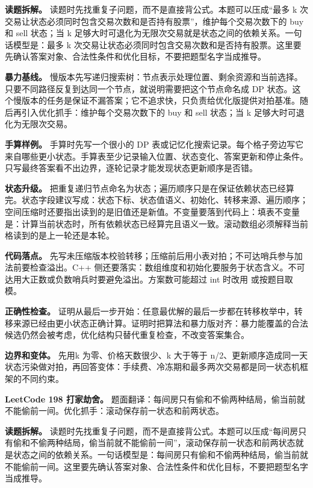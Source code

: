 \textbf{读题拆解。} 读题时先找重复子问题，而不是直接背公式。本题可以压成“最多 k 次交易让状态必须同时包含交易次数和是否持有股票”，维护每个交易次数下的 buy 和 sell 状态；当 k 足够大时可退化为无限次交易就是状态之间的依赖关系。一句话模型是：最多 k 次交易让状态必须同时包含交易次数和是否持有股票。这里要先确认答案对象、合法性条件和优化目标，不要把题型名字当成推导。

\textbf{暴力基线。} 慢版本先写递归搜索树：节点表示处理位置、剩余资源和当前选择。只要不同路径反复到达同一个节点，就说明需要把这个节点命名成 DP 状态。这个慢版本的任务是保证不漏答案；它不追求快，只负责给优化版提供对拍基准。随后再引入优化抓手：维护每个交易次数下的 buy 和 sell 状态；当 k 足够大时可退化为无限次交易。

\textbf{手算样例。} 手算时先写一个很小的 DP 表或记忆化搜索记录。每个格子旁边写它来自哪些更小状态。手算表至少记录输入位置、状态变化、答案更新和停止条件。只写最终答案看不出边界，逐轮记录才能发现状态更新顺序是否错。

\textbf{状态升级。} 把重复递归节点命名为状态；遍历顺序只是在保证依赖状态已经算完。状态字段建议写成：状态下标、状态值语义、初始化、转移来源、遍历顺序；空间压缩时还要指出读到的是旧值还是新值。不变量要落到代码上：填表不变量是：计算当前状态时，所有依赖状态已经算完且语义一致。滚动数组必须解释当前格读到的是上一轮还是本轮。

\textbf{代码落点。} 先写未压缩版本校验转移；压缩前后用小表对拍；不可达哨兵参与加法前要检查溢出。C++ 侧还要落实：数组维度和初始化要服务于状态含义。不可达用大正数或负数哨兵时要避免溢出。方案数可能超过 int 时改用  或按题目取模。

\textbf{正确性检查。} 证明从最后一步开始：任意最优解的最后一步都在转移枚举中，转移来源已经由更小状态正确计算。证明时把算法和暴力版对齐：暴力能覆盖的合法候选仍然会被考虑，优化结构只替代重复检查，不改变答案集合。

\textbf{边界和变体。} 先用k 为零、价格天数很少、k 大于等于 n/2、更新顺序造成同一天状态污染做对拍，再回答变体：手续费、冷冻期和最多两次交易都是同一状态机框架的不同约束。

\noindent\textbf{LeetCode 198 打家劫舍。} 题面翻译：每间房只有偷和不偷两种结局，偷当前就不能偷前一间。优化抓手：滚动保存前一状态和前两状态。

\textbf{读题拆解。} 读题时先找重复子问题，而不是直接背公式。本题可以压成“每间房只有偷和不偷两种结局，偷当前就不能偷前一间”，滚动保存前一状态和前两状态就是状态之间的依赖关系。一句话模型是：每间房只有偷和不偷两种结局，偷当前就不能偷前一间。这里要先确认答案对象、合法性条件和优化目标，不要把题型名字当成推导。

